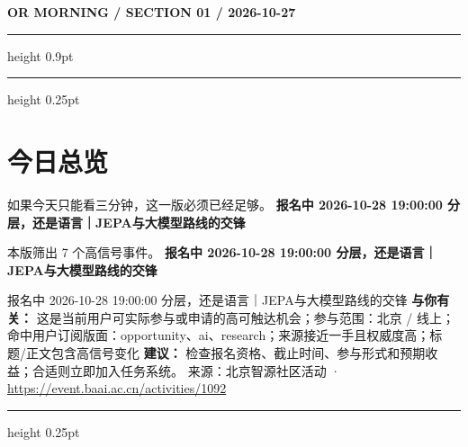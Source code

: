 \documentclass[10.5pt]{ctexart}
\begin{document}
{\small\bfseries OR MORNING / SECTION 01 / 2026-10-27}
\vspace{2mm}
\hrule height 0.9pt
\vspace{1.5mm}
\hrule height 0.25pt
\vspace{4mm}
\section*{今日总览}
{\color{ormuted} 如果今天只能看三分钟，这一版必须已经足够。}
\vspace{2mm}
{\fontsize{25}{29}\selectfont\bfseries 报名中 2026-10-28 19:00:00 分层，还是语言｜JEPA与大模型路线的交锋}\par
\vspace{2mm}
{\large 本版筛出 7 个高信号事件。}
\vspace{3mm}
{\Large\bfseries 报名中 2026-10-28 19:00:00 分层，还是语言｜JEPA与大模型路线的交锋}\par
报名中 2026-10-28 19:00:00 分层，还是语言｜JEPA与大模型路线的交锋
\textbf{与你有关：} 这是当前用户可实际参与或申请的高可触达机会；参与范围：北京 / 线上；命中用户订阅版面：opportunity、ai、research；来源接近一手且权威度高；标题/正文包含高信号变化
\textbf{建议：} 检查报名资格、截止时间、参与形式和预期收益；合适则立即加入任务系统。
{\footnotesize\color{ormuted} 来源：北京智源社区活动 · \url{https://event.baai.ac.cn/activities/1092}}
\vspace{3mm}
\hrule height 0.25pt
\vspace{3mm}
\end{document}
